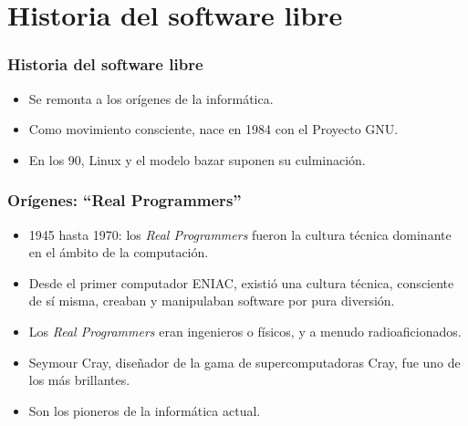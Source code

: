\documentclass{beamer}
\begin{document}
\section{Historia del software libre}


\begin{frame}
\frametitle{Historia del software libre}

\begin{itemize}

\item {Se remonta a los orígenes de la informática.}
\item {Como movimiento consciente, nace en 1984 con el Proyecto GNU.}
\item {En los 90, Linux y el modelo bazar suponen su culminación.}

\end{itemize}

\end{frame}



\begin{frame}
\frametitle{Orígenes: ``Real Programmers''}

\begin{itemize}

\item 1945 hasta 1970: los \textit{Real Programmers} fueron la cultura técnica dominante en el ámbito de la computación. 
\item Desde el primer computador ENIAC, existió una cultura técnica, consciente de sí misma, creaban y manipulaban software por pura diversión. 
\item Los \textit{Real Programmers} eran ingenieros o físicos, y a menudo radioaficionados. 
\item Seymour Cray, diseñador de la gama de supercomputadoras Cray, fue uno de los más brillantes.
\item Son los pioneros de la informática actual.

\end{itemize}

\end{frame}

\end{document}
